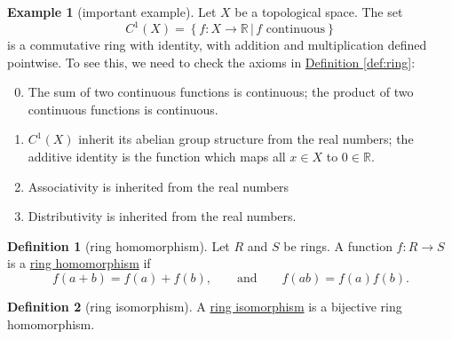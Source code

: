 \documentclass[a4paper]{report}
\newcommand{\R}{\mathbb{R}}
\newcommand{\defn}[1]{\ul{#1}}
\theoremstyle{definition}
\newtheorem{definition}{Definition}[section]
\newtheorem{example}{Example}[section]
\theoremstyle{plain}
\theoremstyle{remark}
\begin{document}
\begin{example}[important example]
  Let $X$ be a topological space. The set
  \begin{equation*}
    C^{1}(X) = \left\{ f\colon X \to \R\,\big|\, f \text{ continuous} \right\}
  \end{equation*}
  is a commutative ring with identity, with addition and multiplication defined pointwise. To see this, we need to check the axioms in \hyperref[def:ring]{Definition \ref*{def:ring}}:
  \begin{enumerate}
      \setcounter{enumi}{-1}
    \item The sum of two continuous functions is continuous; the product of two continuous functions is continuous.
    \item $C^{1}(X)$ inherit its abelian group structure from the real numbers; the additive identity is the function which maps all $x \in X$ to $0 \in \R$.
    \item Associativity is inherited from the real numbers
    \item Distributivity is inherited from the real numbers.
  \end{enumerate}
\end{example}

\begin{definition}[ring homomorphism]
  \label{def:ringhomomorphism}
  Let $R$ and $S$ be rings. A function $f\colon R \to S$ is a \defn{ring homomorphism} if
  \begin{equation*}
    f(a+b) = f(a) + f(b), \qquad \text{and}\qquad f(ab) = f(a)f(b).
  \end{equation*}
\end{definition}

\begin{definition}[ring isomorphism]
  \label{def:ringisomorphism} 
  A \defn{ring isomorphism} is a bijective ring homomorphism.
\end{definition}
\end{document}
